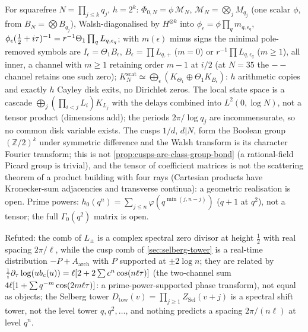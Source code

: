 \begin{theorem}
\label{thm:squarefree-walsh-cascade}
For squarefree $N = \prod_{j\le k}q_j$, $h = 2^k$: $\Phi_{0,N} = \phi\,\mathcal M_N$, $\mathcal M_N = \bigotimes_jM_{q_j}$ (one scalar $\phi$, from
$B_N = \bigotimes B_{q_j}$), Walsh-diagonalised by $H^{\otimes k}$ into $\phi_\epsilon = \phi\prod_qm_{q,\epsilon_q}$,
$\phi_\epsilon(\tfrac12+i\tau)^{-1} = r^{-1}\Theta_1\prod_qL_{q,\epsilon_q}$; with $m(\epsilon)$ minus signs the minimal pole-removed symbols are
$I_\epsilon = \Theta_1B_\epsilon$, $B_\epsilon = \prod L_{q,+}$ ($m = 0$) or $r^{-1}\prod L_{q,\epsilon_q}$ ($m\ge1$), all inner, a channel with $m\ge1$
retaining order $m-1$ at $i/2$ (at $N = 35$ the $--$ channel retains one such zero); $K^{\mathrm{scat}}_N\simeq\bigoplus_\epsilon(K_{\Theta_1}\oplus\Theta_1K_{B_\epsilon})$:
$h$ arithmetic copies and exactly $h$ Cayley disk exits, no Dirichlet zeros. The local state space is a cascade
$\bigoplus_j(\prod_{i<j}L_i)K_{L_j}$ with the delays combined into $L^2(0,\log N)$, not a tensor product (dimensions add); the
periods $2\pi/\log q_j$ are incommensurate, so no common disk variable exists. The cusps $1/d$, $d|N$, form the Boolean group
$(\mathbb Z/2)^k$ under symmetric difference and the Walsh transform is its character Fourier transform; this is not
\cref{prop:cusps-are-class-group-bond} (a rational-field Picard group is trivial), and the tensor of coefficient matrices is not
the scattering theorem of a product building with four rays (Cartesian products have Kronecker-sum adjacencies and transverse
continua): a geometric realisation is open. Prime powers: $h_0(q^n) = \sum_{j\le n}\varphi(q^{\min(j,n-j)})$ ($q+1$ at $q^2$), not a tensor;
the full $\Gamma_0(q^2)$ matrix is open.
\end{theorem}

\begin{observation}
\label{obs:two-combs-different}
Refuted: the comb of $L_\pm$ is a complex spectral zero divisor at height $\tfrac12$ with real spacing $2\pi/\ell$, while the cusp comb
of \cref{sec:selberg-tower} is a real-time distribution $-P+A_{\mathrm{arch}}$ with $P$ supported at $\pm2\log n$; they are related
by $\tfrac1i\partial_\tau\log(ub_c(u)) = \ell[2+2\sum c^n\cos(n\ell\tau)]$ (the two-channel sum $4\ell[1+\sum q^{-m}\cos(2m\ell\tau)]$: a
prime-power-supported phase transform), not equal as objects; the Selberg tower $D_{\mathrm{tow}}(v) = \prod_{j\ge1}Z_{\mathrm{Sel}}(v+j)$ is a
spectral shift tower, not the level tower $q,q^2,\dots$, and nothing predicts a spacing $2\pi/(n\ell)$ at level $q^n$.
\end{observation}

